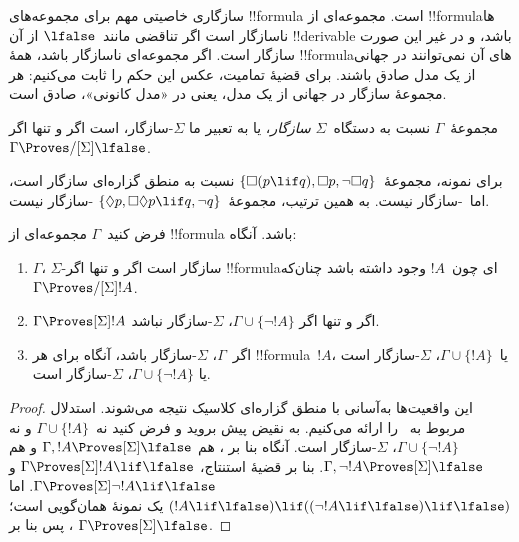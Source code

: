 \documentclass[../../../include/open-logic-section]{subfiles}
\begin{document}


سازگاری خاصیتی مهم برای مجموعه‌های !!{formula} است. مجموعه‌ای از
!!{formula}ها ناسازگار است اگر تناقضی مانند~$\lfalse$ از آن
!!{derivable} باشد، و در غیر این صورت سازگار است. اگر مجموعه‌ای
ناسازگار باشد، همهٔ !!{formula}های آن نمی‌توانند در جهانی از یک مدل
صادق باشند. برای قضیهٔ تمامیت، عکس این حکم را ثابت می‌کنیم: هر مجموعهٔ
سازگار در جهانی از یک مدل، یعنی در «مدل کانونی»، صادق است.

\begin{defn}
  مجموعهٔ~$\Gamma$ نسبت به دستگاه~$\Sigma$ \emph{سازگار}، یا به تعبیر
  ما $\Sigma$-سازگار، است اگر و تنها اگر
  $\Gamma \Proves/[\Sigma] \lfalse$.
\end{defn}

برای نمونه، مجموعهٔ~$\{ \Box(p \lif q), \Box p, \lnot\Box q \}$ نسبت
به منطق گزاره‌ای سازگار است، اما~-سازگار نیست. به همین ترتیب،
مجموعهٔ~$\{ \Diamond p, \Box\Diamond p \lif q, \lnot q \}$
-سازگار نیست.

\begin{prop}
  فرض کنید~$\Gamma$ مجموعه‌ای از !!{formula} باشد. آنگاه:
  \begin{enumerate}
  \item $\Gamma$، $\Sigma$-سازگار است اگر و تنها اگر !!{formula}ای
    چون~$!A$ وجود داشته باشد چنان‌که~$\Gamma \Proves/[\Sigma] !A$.
  \item {}%
    $\Gamma \Proves[\Sigma] !A$ اگر و تنها اگر
    $\Gamma \cup \{\lnot!A\}$، $\Sigma$-سازگار نباشد.
  \item {}%
    اگر~$\Gamma$، $\Sigma$-سازگار باشد، آنگاه برای هر !!{formula}~$!A$،
    یا~$\Gamma \cup \{!A\}$، $\Sigma$-سازگار است یا
    $\Gamma \cup \{\lnot!A\}$، $\Sigma$-سازگار است.
  \end{enumerate}
\end{prop}

\begin{proof}
  این واقعیت‌ها به‌آسانی با منطق گزاره‌ای کلاسیک نتیجه می‌شوند. استدلال
  مربوط به~ را ارائه می‌کنیم. به نقیض
  پیش بروید و فرض کنید نه~$\Gamma \cup \{!A\}$ و نه
  $\Gamma \cup \{\lnot!A\}$، $\Sigma$-سازگار است. آنگاه بنا بر
  ، هم
  $\Gamma, !A \Proves[\Sigma] \lfalse$ و هم
  $\Gamma, \lnot !A \Proves[\Sigma] \lfalse$. بنا بر قضیهٔ استنتاج،
  $\Gamma \Proves[\Sigma] !A \lif \lfalse$ و
  $\Gamma \Proves[\Sigma] \lnot!A \lif \lfalse$. اما
  $(!A \lif \lfalse) \lif ((\lnot!A \lif \lfalse) \lif \lfalse)$
  یک نمونهٔ همان‌گویی است؛ پس بنا بر
  ،
  $\Gamma \Proves[\Sigma] \lfalse$.
\end{proof}
\end{document}
